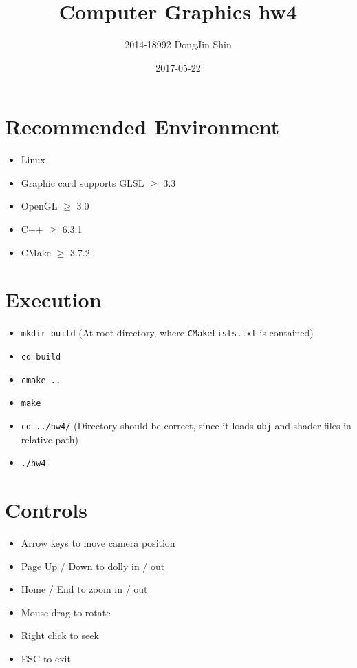 \documentclass[11pt]{oblivoir}
\title{Computer Graphics hw4}
\date{2017-05-22}
\author{2014-18992 DongJin Shin}
\begin{document}
	
\maketitle

\section{Recommended Environment}

\begin{itemize}
\item Linux
\item Graphic card supports GLSL $\geq$ 3.3
\item OpenGL $\geq$ 3.0
\item C++ $\geq$ 6.3.1
\item CMake $\geq$ 3.7.2
\end{itemize}

\section{Execution}

\begin{itemize}
\item \verb|mkdir build| (At root directory, where \verb|CMakeLists.txt| is contained)
\item \verb|cd build|
\item \verb|cmake ..|
\item \verb|make|
\item \verb|cd ../hw4/| (Directory should be correct, since it loads \verb|obj| and shader files in relative path)
\item \verb|./hw4|
\end{itemize}

\section{Controls}
\begin{itemize}
\item Arrow keys to move camera position
\item Page Up / Down to dolly in / out
\item Home / End to zoom in / out
\item Mouse drag to rotate
\item Right click to seek
\item ESC to exit
\end{itemize}
\end{document}
